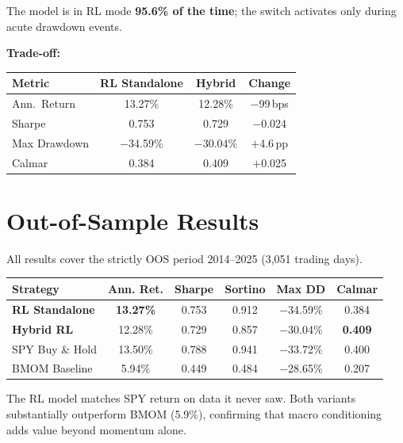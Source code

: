 \documentclass[11pt, a4paper]{article}
\begin{document}
The model is in RL mode \textbf{95.6\% of the time}; the switch activates only during acute drawdown events.

\textbf{Trade-off:}

\begin{center}
\begin{tabular}{lccc}
\toprule
\textbf{Metric} & \textbf{RL Standalone} & \textbf{Hybrid} & \textbf{Change} \\
\midrule
Ann.\ Return    & 13.27\%  & 12.28\%  & $-$99\,bps \\
Sharpe          & 0.753    & 0.729    & $-$0.024 \\
Max Drawdown    & $-$34.59\% & $-$30.04\% & $+$4.6\,pp \\
Calmar          & 0.384    & 0.409    & $+$0.025 \\
\bottomrule
\end{tabular}
\end{center}

\section{Out-of-Sample Results}

All results cover the strictly OOS period 2014--2025 (3,051 trading days).

\begin{center}
\begin{tabular}{lccccc}
\toprule
\textbf{Strategy} & \textbf{Ann. Ret.} & \textbf{Sharpe} & \textbf{Sortino} & \textbf{Max DD} & \textbf{Calmar} \\
\midrule
\rowcolor{blue!6}
\textbf{RL Standalone} & \textbf{13.27\%} & 0.753 & 0.912 & $-$34.59\% & 0.384 \\
\rowcolor{green!6}
\textbf{Hybrid RL}     & 12.28\%          & 0.729 & 0.857 & $-$30.04\% & \textbf{0.409} \\
SPY Buy \& Hold        & 13.50\%          & 0.788 & 0.941 & $-$33.72\% & 0.400 \\
BMOM Baseline          &  5.94\%          & 0.449 & 0.484 & $-$28.65\% & 0.207 \\
\bottomrule
\end{tabular}
\end{center}

The RL model matches SPY return on data it never saw. Both variants substantially outperform BMOM (5.9\%), confirming that macro conditioning adds value beyond momentum alone.
\end{document}
